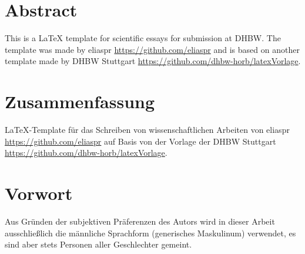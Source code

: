 \pagestyle{empty}

\section*{Abstract}


This is a LaTeX template for scientific essays for submission at DHBW. The template was made by eliaspr \url{https://github.com/eliaspr} and is based on another template made by DHBW Stuttgart \url{https://github.com/dhbw-horb/latexVorlage}.

\newpage
\section*{Zusammenfassung}


LaTeX-Template für das Schreiben von wissenschaftlichen Arbeiten von eliaspr \url{https://github.com/eliaspr} auf Basis von der Vorlage der DHBW Stuttgart \url{https://github.com/dhbw-horb/latexVorlage}.

\newpage
\section*{Vorwort}


Aus Gründen der subjektiven Präferenzen des Autors wird in dieser Arbeit ausschließlich die männliche Sprachform (generisches Maskulinum) verwendet, es sind aber stets Personen aller Geschlechter gemeint.
